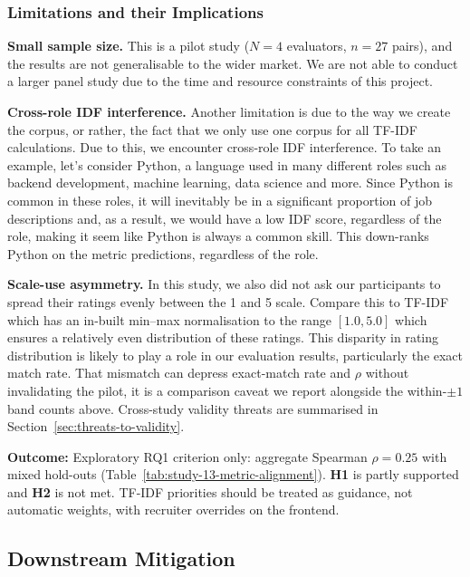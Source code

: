 \subsubsection{Limitations and their Implications}
\label{subsubsec:study-13-limitations}

\textbf{Small sample size.} This is a pilot study ($N = 4$ evaluators, $n = 27$ pairs), and the results are not generalisable to the wider market.
We are not able to conduct a larger panel study due to the time and resource constraints of this project.

\textbf{Cross-role IDF interference.} Another limitation is due to the way we create the corpus, or rather, the fact that we only use one corpus for all TF-IDF calculations.
Due to this, we encounter cross-role IDF interference. To take an example, let's consider Python, a language used in many different roles such
as backend development, machine learning, data science and more. Since Python is common in these roles, it will inevitably be in a significant
proportion of job descriptions and, as a result, we would have a low IDF score, regardless of the role, making it seem like Python is 
always a common skill. This down-ranks Python on the metric predictions, regardless of the role.

\textbf{Scale-use asymmetry.} In this study, we also did not ask our participants to spread their ratings evenly between the 1 and 5 scale. Compare this to TF-IDF
which has an in-built min--max normalisation to the range $[1.0, 5.0]$ which ensures a relatively even distribution of these ratings.
This disparity in rating distribution is likely to play a role in our evaluation results, particularly the exact match rate. 
That mismatch can depress exact-match rate and $\rho$ without invalidating the pilot, it is a
comparison caveat we report alongside the within-$\pm 1$ band counts above. Cross-study validity threats are summarised in
Section~\ref{sec:threats-to-validity}.

\textbf{Outcome:} Exploratory RQ1 criterion only: aggregate Spearman $\rho = 0.25$ with mixed hold-outs 
(Table~\ref{tab:study-13-metric-alignment}).
\textbf{H1} is partly supported and \textbf{H2} is not met. TF-IDF priorities should be treated as guidance, 
not automatic weights, with recruiter overrides on the frontend.

\subsection{Downstream Mitigation}
\label{subsec:downstream-mitigation}


